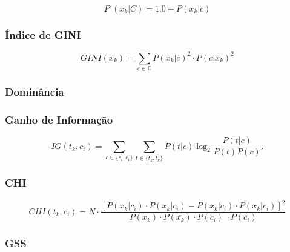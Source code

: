 \begin{equation}\label{eqn::plinhattalquec}
   P'(x_k|C) = 1.0 - P(x_k|c)
\end{equation}

\subsubsection{Índice de GINI}
\label{subsubsection::gini}

\cite{Shang07}
\begin{equation}\label{eqn::gini}
   GINI(x_k) = \sum_{c \in \mathbb{C}} P(x_k|c)^2 \cdot P(c|x_k)^2
\end{equation}

\subsubsection{Dominância}
\label{subsubsection::dom}

\subsubsection{Ganho de Informação}
\label{subsubsection::ig}

\cite{couto06}
\begin{equation}\label{eqn::ig}
   IG(t_k, c_i) = \sum_{c \in \{c_i, \overline{c_i}\}}\sum_{t \in \{t_k, \overline{t_k}\}}P(t|c)\log_2\frac{P(t|c)}{P(t)P(c)}.
\end{equation}

\subsubsection{CHI}
\label{subsubsection::chi}

\cite{Zheng03}
\begin{equation}\label{eqn::chi}
   CHI(t_k, c_i) = N \cdot \frac{ [ P(x_k|c_i) \cdot P(\overline{x_k}|\overline{c_i}) - P(x_k|\overline{c_i}) \cdot P(\overline{x_k}|c_i) ]^2 } {P(x_k) \cdot P(\overline{x_k}) \cdot P(c_i) \ \cdot P(\overline{c_i}) }
\end{equation}

\subsubsection{GSS}
\label{subsubsection::gss}


